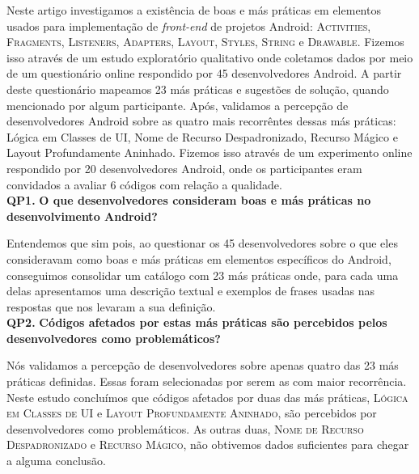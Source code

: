 Neste artigo investigamos a existência de boas e más práticas em elementos usados para implementação de \textit{front-end} de projetos Android: \textsc{Activities}, \textsc{Fragments}, \textsc{Listeners}, \textsc{Adapters}, \textsc{Layout}, \textsc{Styles}, \textsc{String} e \textsc{Drawable}. Fizemos isso através de um estudo exploratório qualitativo onde coletamos dados por meio de um questionário online respondido por 45 desenvolvedores Android. A partir deste questionário mapeamos 23 más práticas e sugestões de solução, quando mencionado por algum participante. Após, validamos a percepção de desenvolvedores Android sobre as quatro mais recorrêntes dessas más práticas: Lógica em Classes de UI, Nome de Recurso Despadronizado, Recurso Mágico e Layout Profundamente Aninhado. Fizemos isso através de um experimento online respondido por 20 desenvolvedores Android, onde os participantes eram convidados a avaliar 6 códigos com relação a qualidade. \\

\textbf{QP1.} \textbf{O que desenvolvedores consideram boas e más práticas no desenvolvimento Android?} 

Entendemos que sim pois, ao questionar os 45 desenvolvedores sobre o que eles consideravam como boas e más práticas em elementos específicos do Android, conseguimos consolidar um catálogo com 23 más práticas onde, para cada uma delas apresentamos uma descrição textual e exemplos de frases usadas nas respostas que nos levaram a sua definição. \\

\textbf{QP2.} \textbf{Códigos afetados por estas más práticas são percebidos pelos desenvolvedores como problemáticos?}

Nós validamos a percepção de desenvolvedores sobre apenas quatro das 23 más práticas definidas. Essas foram selecionadas por serem as com maior recorrência. Neste estudo concluímos que códigos afetados por duas das más práticas, \textsc{Lógica em Classes de UI} e \textsc{Layout Profundamente Aninhado}, são percebidos por desenvolvedores como problemáticos. As outras duas, \textsc{Nome de Recurso Despadronizado} e \textsc{Recurso Mágico}, não obtivemos dados suficientes para chegar a alguma conclusão.



